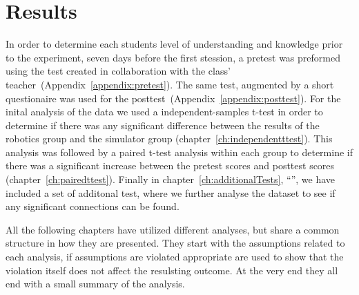 \chapter{Results}
In order to determine each students level of understanding and knowledge prior to the experiment, seven days before the first stession, a pretest was preformed using the test created in collaboration with the class' teacher~(Appendix~\ref{appendix:pretest}). 
The same test, augmented by a short questionaire was used for the posttest~(Appendix~\ref{appendix:posttest}).
For the inital analysis of the data we used a independent-samples t-test in order to determine if there was any
significant difference between the results of the robotics group and the simulator group (chapter~\ref{ch:independentttest}).
This analysis was followed by a paired t-test analysis within each group 
to determine if there was a significant increase between the pretest scores and posttest scores (chapter~\ref{ch:pairedttest}).
Finally in chapter~\ref{ch:additionalTests}, "`"', we have included a set of additonal test,
where we further analyse the dataset to see if any significant connections can be found. 

\bigskip\noindent
All the following chapters have utilized different analyses, but share a common structure in how they are presented.
They start with the assumptions related to each analysis, if assumptions are violated appropriate are used to show that the violation itself does not affect the resulsting outcome.
At the very end they all end with a small summary of the analysis. 





